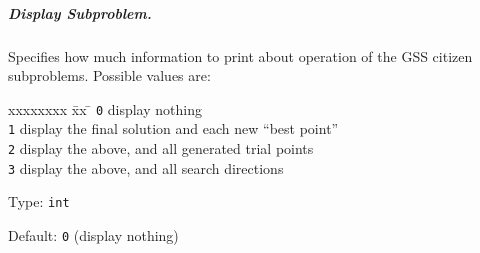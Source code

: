 \subparagraph{Display Subproblem.}  \label{param:GSN-displaysub}
Specifies how much information to print about operation of the GSS citizen
subproblems.  Possible values are:
\begin{tabbing}
  xxxxxxxx \= xx \= \kill
     \> {\tt 0} \> display nothing  \\
     \> {\tt 1} \> display the final solution and each new ``best point''  \\
     \> {\tt 2} \> display the above, and all generated trial points  \\
     \> {\tt 3} \> display the above, and all search directions  \\
\end{tabbing}

\hspace{0.2in}
Type: {\tt int}

\hspace{0.2in}
Default: {\tt 0} (display nothing)
